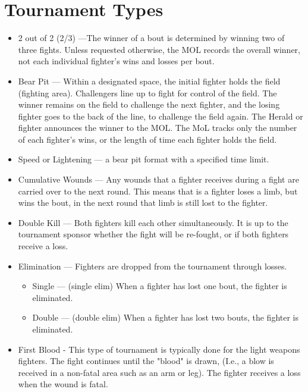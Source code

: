\documentclass{article}
\begin{document}
\section{Tournament Types}

\begin{itemize}
\item 2 out of 2 (2/3) ---The winner of a bout is determined by winning two of three fights. Unless requested
otherwise, the MOL records the overall winner, not each individual fighter’s wins and losses per bout.

\item Bear Pit --- Within a designated space, the initial fighter holds the field (fighting area). Challengers
line up to fight for control of the field. The winner remains on the field to challenge the next fighter,
and the losing fighter goes to the back of the line, to challenge the field again. The Herald or fighter
announces the winner to the MOL. The MoL tracks only the number of each fighter’s wins, or the
length of time each fighter holds the field.

\item Speed or Lightening --- a bear pit format with a specified time limit.
\item Cumulative Wounds --- Any wounds that a fighter receives during a fight are carried over to the next
round. This means that is a fighter loses a limb, but wins the bout, in the next round that limb is still
lost to the fighter.

\item Double Kill --- Both fighters kill each other simultaneously. It is up to the tournament sponsor whether
the fight will be re-fought, or if both fighters receive a loss.

\item Elimination --- Fighters are dropped from the tournament through losses.
\begin{itemize}
\item Single --- (single elim) When a fighter has lost one bout, the fighter is eliminated.

\item Double --- (double elim) When a fighter has lost two bouts, the fighter is eliminated.
\end{itemize}
\item First Blood - This type of tournament is typically done for the light weapons fighters. The fight
continues until the "blood" is drawn, (I.e., a blow is received in a non-fatal area such as an arm or leg).
The fighter receives a loss when the wound is fatal.


\end{itemize}
\end{document}
